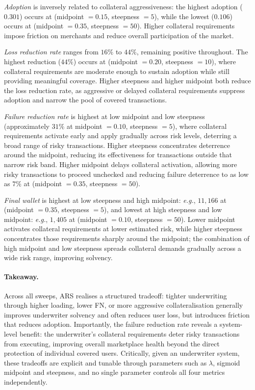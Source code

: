 \documentclass{article} %
\begin{document}
\textit{Adoption} is inversely related to collateral aggressiveness: the highest adoption ($0.301$) occurs at (midpoint $= 0.15$, steepness $= 5$), while the lowest ($0.106$) occurs at (midpoint $= 0.35$, steepness $= 50$). Higher collateral requirements impose friction on merchants and reduce overall participation of the market.

\textit{Loss reduction rate} ranges from $16\%$ to $44\%$, remaining positive throughout. The highest reduction ($44\%$) occurs at (midpoint $= 0.20$, steepness $= 10$), where collateral requirements are moderate enough to sustain adoption while still providing meaningful coverage. Higher steepness and higher midpoint both reduce the loss reduction rate, as aggressive or delayed collateral requirements suppress adoption and narrow the pool of covered transactions.

\textit{Failure reduction rate} is highest at low midpoint and low steepness (approximately $31\%$ at midpoint $= 0.10$, steepness $= 5$), where collateral requirements activate early and apply gradually across risk levels, deterring a broad range of risky transactions. Higher steepness concentrates deterrence around the midpoint, reducing its effectiveness for transactions outside that narrow risk band. Higher midpoint delays collateral activation, allowing more risky transactions to proceed unchecked and reducing failure deterrence to as low as $7\%$ at (midpoint $= 0.35$, steepness $= 50$).

\textit{Final wallet} is highest at low steepness and high midpoint: \emph{e.g.}, $11,166$ at (midpoint $= 0.35$, steepness $= 5$), and lowest at high steepness and low midpoint: \emph{e.g.}, $1,405$ at (midpoint $= 0.10$, steepness $= 50$). Lower midpoint activates collateral requirements at lower estimated risk, while higher steepness concentrates those requirements sharply around the midpoint; the combination of high midpoint and low steepness spreads collateral demands gradually across a wide risk range, improving solvency.

\paragraph{Takeaway.}
Across all sweeps, \textsc{ARS} realises a structured tradeoff: tighter underwriting through higher loading, lower FN, or more aggressive collateralisation generally improves underwriter solvency and often reduces user loss, but introduces friction that reduces adoption. Importantly, the failure reduction rate reveals a system-level benefit: the underwriter's collateral requirements deter risky transactions from executing, improving overall marketplace health beyond the direct protection of individual covered users. Critically, given an underwriter system, these tradeoffs are explicit and tunable through parameters such as $\lambda$, sigmoid midpoint and steepness, and no single parameter controls all four metrics independently. 
\end{document}
